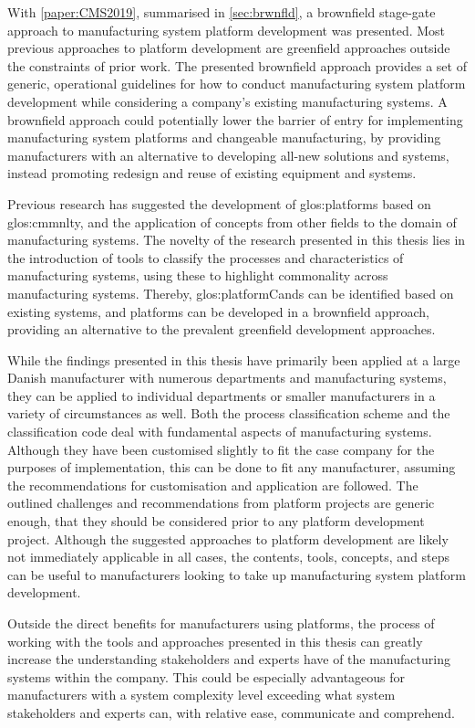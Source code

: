 With \cref{paper:CMS2019}, summarised in \cref{sec:brwnfld}, a brownfield stage-gate approach to manufacturing system platform development was presented.
Most previous approaches to platform development are greenfield approaches outside the constraints of prior work.
The presented brownfield approach provides a set of generic, operational guidelines for how to conduct manufacturing system platform development while considering a company's existing manufacturing systems.
A brownfield approach could potentially lower the barrier of entry for implementing manufacturing system platforms and changeable manufacturing, by providing manufacturers with an alternative to developing all-new solutions and systems, instead promoting redesign and reuse of existing equipment and systems.

Previous research has suggested the development of \gls{glos:platform}s based on \gls{glos:cmmnlty}, and the application of concepts from other fields to the domain of manufacturing systems.
The novelty of the research presented in this thesis lies in the introduction of tools to classify the processes and characteristics of manufacturing systems, using these to highlight commonality across manufacturing systems.
Thereby, \gls{glos:platformCand}s can be identified based on existing systems, and platforms can be developed in a brownfield approach, providing an alternative to the prevalent greenfield development approaches.

While the findings presented in this thesis have primarily been applied at a large Danish manufacturer with numerous departments and manufacturing systems, they can be applied to individual departments or smaller manufacturers in a variety of circumstances as well.
Both the process classification scheme and the classification code deal with fundamental aspects of manufacturing systems.
Although they have been customised slightly to fit the case company for the purposes of implementation, this can be done to fit any manufacturer, assuming the recommendations for customisation and application are followed.
The outlined challenges and recommendations from platform projects are generic enough, that they should be considered prior to any platform development project.
Although the suggested approaches to platform development are likely not immediately applicable in all cases, the contents, tools, concepts, and steps can be useful to manufacturers looking to take up manufacturing system platform development.

Outside the direct benefits for manufacturers using platforms, the process of working with the tools and approaches presented in this thesis can greatly increase the understanding stakeholders and experts have of the manufacturing systems within the company.
This could be especially advantageous for manufacturers with a system complexity level exceeding what system stakeholders and experts can, with relative ease, communicate and comprehend.

